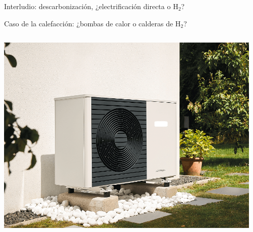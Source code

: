 \documentclass[aspectratio=169, xcolor={usenames,svgnames,dvipsnames}]{beamer}
\begin{document}
\begin{frame}{Interludio: \hspace{3mm}descarbonización, ¿electrificación directa o $\textrm{H}_2$?}

    \vspace{3mm}
    Caso de la calefacción: ¿bombas de calor o calderas de $\textrm{H}_2$?
    \begin{columns}
    \begin{column}{0.4\columnwidth}
        \vspace{-5mm}
        \begin{center}
            \includegraphics[height=0.55\textheight]{../figs/heat_pump_air.png}
        \end{center}
    \end{column}  
    \begin{column}{0.4\columnwidth}
        \begin{center}

\end{center}
\end{column}
\end{columns}
\end{frame}
\end{document}

